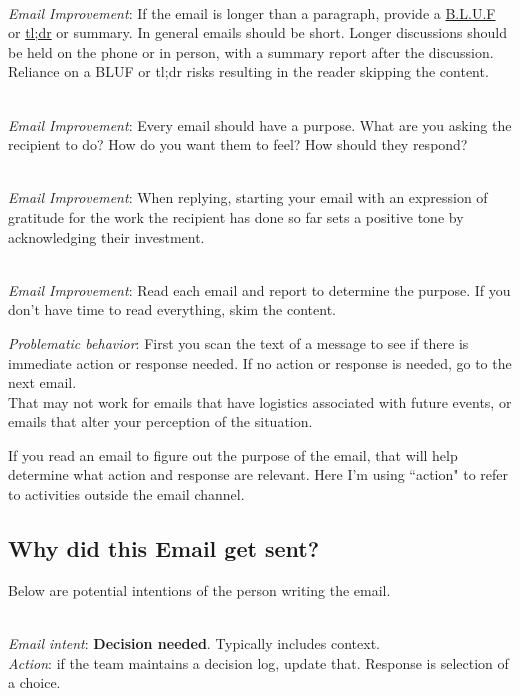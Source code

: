 \ \\
\textit{Email Improvement}: If the email is longer than a paragraph, provide a \href{https://en.wikipedia.org/wiki/BLUF_(communication)}{B.L.U.F} 
or 
\href{https://en.wikipedia.org/wiki/Wikipedia:Too_long;_didn\%27t_read}{tl;dr} 
or summary. In general emails should be short. Longer discussions should be held on the phone or in person, with a summary report after the discussion. Reliance on a BLUF or tl;dr risks resulting in the reader skipping the content. 

\ \\
\textit{Email Improvement}: Every email should have a purpose. What are you asking the recipient to do? How do you want them to feel? How should they respond?

\ \\
\textit{Email Improvement}: When replying, starting your email with an expression of gratitude for the work the recipient has done so far sets a positive tone by acknowledging their investment.

\ \\
\textit{Email Improvement}: Read each email and report to determine the purpose. If you don't have time to read everything, skim the content. 

\textit{Problematic behavior}: First you scan the text of a message to see if there is immediate action or response needed. If no action or response is needed, go to the next email. \\
That may not work for emails that have logistics associated with future events, or emails that alter your perception of the situation.


If you read an email to figure out the purpose of the email, that will help determine what action and response are relevant. Here I'm using ``action" to refer to activities outside the email channel. 


\subsection*{Why did this Email get sent?}
Below are potential intentions of the person writing the email. 

\ \\
\textit{Email intent}: \textbf{Decision needed}. Typically includes context. \\
\textit{Action}: if the team maintains a decision log, update that.
Response is selection of a choice.

